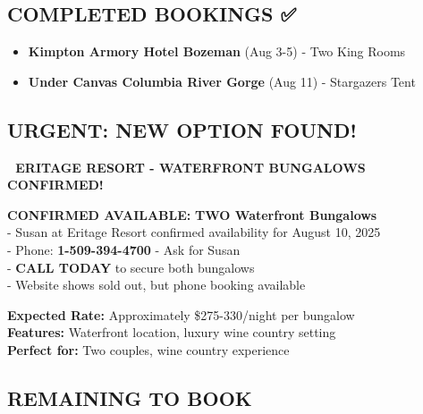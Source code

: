 \documentclass[
  10pt,
]{article}
\providecommand{\tightlist}{%
  \setlength{\itemsep}{0pt}\setlength{\parskip}{0pt}}
\begin{document}
\subsection{\texorpdfstring{\textcolor{secondary}{COMPLETED BOOKINGS ✅}}{}}\label{section-54}

\begin{itemize}
\tightlist
\item
  \textbf{\textcolor{primary}{Kimpton Armory Hotel Bozeman}} (Aug 3-5) -
  Two King Rooms
\item
  \textbf{\textcolor{primary}{Under Canvas Columbia River Gorge}} (Aug
  11) - Stargazers Tent
\end{itemize}

\subsection{\texorpdfstring{\textcolor{secondary}{URGENT: NEW OPTION FOUND!}}{}}\label{section-55}

\textbf{\textcolor{primary}{🚨 ERITAGE RESORT - WATERFRONT BUNGALOWS CONFIRMED!}}

\textbf{\textcolor{secondary}{CONFIRMED AVAILABLE:}} \textbf{TWO
Waterfront Bungalows}\\
- Susan at Eritage Resort confirmed availability for August 10, 2025\\
- Phone: \textbf{1-509-394-4700} - Ask for Susan\\
- \textbf{\textcolor{primary}{CALL TODAY}} to secure both bungalows\\
- Website shows sold out, but phone booking available

\textbf{\textcolor{secondary}{Expected Rate:}} Approximately
\$275-330/night per bungalow\\
\textbf{\textcolor{secondary}{Features:}} Waterfront location, luxury
wine country setting\\
\textbf{\textcolor{secondary}{Perfect for:}} Two couples, wine country
experience

\subsection{\texorpdfstring{\textcolor{secondary}{REMAINING TO BOOK}}{}}\label{section-56}
\end{document}

